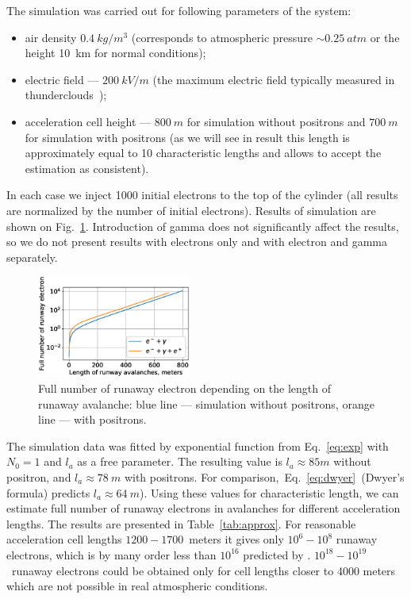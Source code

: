 \documentclass[doublecol,linenumbers]{epl2} %
\begin{document}
The simulation was carried out for following parameters of the system:
\begin{itemize}
    \item air density $0.4~kg/m^3$ (corresponds to atmospheric pressure $\sim 0.25~atm$ or the height 10~km for normal conditions);
    \item electric field --- $200~kV/m$ (the maximum electric field typically measured in thunderclouds~\cite{rakov_uman});
    \item acceleration cell height --- $800~m$ for simulation without positrons and $700~m$ for simulation with positrons (as we will see in result this length is approximately equal to 10 characteristic lengths and allows to accept the estimation as consistent).
\end{itemize}

In each case we inject 1000 initial electrons to the top of the cylinder (all results are  normalized by the number of initial electrons). Results of simulation are shown on Fig.~\ref{fig:sim}. Introduction of gamma does not significantly affect the results, so we do not present results with electrons only and with electron and gamma separately.

\begin{figure}[h]
    \centering
    \includegraphics[width=0.45\textwidth]{figures/simulation.eps}
    \caption{Full number of runaway electron depending on the length of runaway avalanche: blue line --- simulation without positrons, orange line --- with positrons.}
    \label{fig:sim}
\end{figure}

The simulation data was fitted by exponential function from Eq.~\ref{eq:exp} with $N_0 = 1$ and $l_a$ as a free parameter. The resulting value is $l_a \approx 85 m$ without positron, and $l_a \approx 78~m$ with positrons. For comparison,~Eq.~\ref{eq:dwyer}~(Dwyer's formula) predicts $l_a \approx 64~m$). Using these values for characteristic length, we can estimate full number of runaway electrons in avalanches for different acceleration lengths. The results are presented in Table~\ref{tab:approx}. For reasonable acceleration cell lengths  $1200 - 1700$~meters it gives only $10^6-10^8$ runaway electrons, which is by many order less than $10^{16}$ predicted by \cite{Oreshkin_2018}. $10^{18} - 10^{19}$~runaway electrons could be obtained only for cell lengths closer to 4000 meters which are not possible in real atmospheric conditions.
\end{document}
